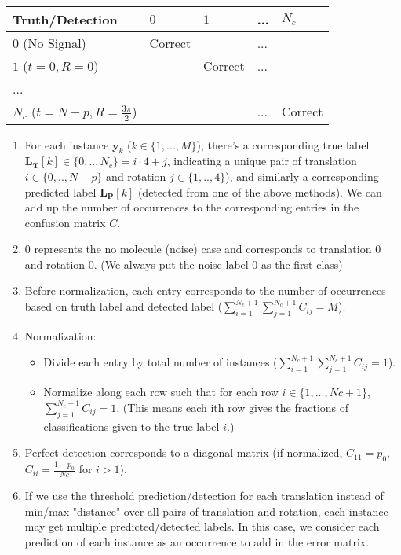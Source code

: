 \documentclass[11pt]{article}
\newcommand{\by}{\boldsymbol{y}}
\begin{document}
    \begin{tabular}{l|l|l|l|l}
        Truth/Detection&$0$&$1$&...&$N_c$\\\hline
        $0$ (No Signal)&Correct& &...& \\\hline
        $1$ ($t=0,R=0$)& &Correct&...& \\\hline
        ...& & & & \\\hline
        $N_c$ ($t=N-p,R=\frac{3\pi}{2}$)& & &...&Correct\\\hline
    \end{tabular}
        
        \begin{enumerate}
            \item For each instance $\by_k$ ($k \in \{1,...,M\}$), there's a corresponding true label $\mathbf{L_T}[k] \in {\{0,..,N_c\}} = i \cdot 4 + j$, indicating a unique pair of translation $i \in {\{0,..,N-p\}}$ and rotation $j \in {\{1,..,4\}}$), and similarly a corresponding predicted label $\mathbf{L_P}[k]$ (detected from one of the above methods). We can add up the number of occurrences to the corresponding entries in the confusion matrix $C$.
            \item $0$ represents the no molecule (noise) case and corresponds to translation $0$ and rotation $0$. (We always put the noise label $0$ as the first class)
            \item Before normalization, each entry corresponds to the number of occurrences based on truth label and detected label ($\sum_{i=1}^{N_c+1}\sum_{j=1}^{N_c+1} C_{ij} = M$).
            \item Normalization: 
            \begin{itemize}
                \item Divide each entry by total number of instances ($\sum_{i=1}^{N_c+1}\sum_{j=1}^{N_c+1} C_{ij} = 1$).
                \item Normalize along each row such that for each row $i \in \{1,...,Nc+1\}$, $\sum_{j=1}^{N_c+1} C_{ij} = 1$. (This means each ith row gives the fractions of classifications given to the true label $i$.)
            \end{itemize}
            \item Perfect detection corresponds to a diagonal matrix (if normalized, $C_{11}=p_0$, $C_{ii}=\frac{1-p_0}{Nc}$ for $i>1$).
            \item If we use the threshold prediction/detection for each translation instead of min/max "distance" over all pairs of translation and rotation, each instance may get multiple predicted/detected labels. In this case, we consider each prediction of each instance as an occurrence to add in the error matrix. 
        \end{enumerate}
        
\end{document}
